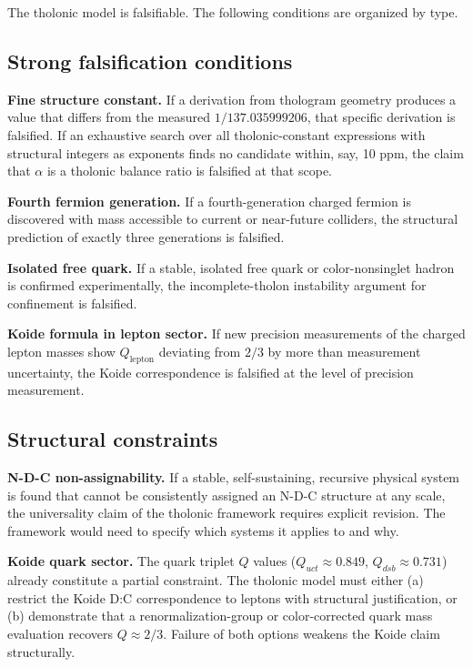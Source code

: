 \documentclass[12pt]{article}
\begin{document}
The tholonic model is falsifiable. The following conditions are
organized by type.

\subsection{Strong falsification conditions}\label{strong-falsification-conditions}

\textbf{Fine structure constant.} If a derivation from thologram
geometry produces a value that differs from the measured
\(1/137.035999206\), that specific derivation is falsified. If an
exhaustive search over all tholonic-constant expressions with structural
integers as exponents finds no candidate within, say, 10 ppm, the claim
that \(\alpha\) is a tholonic balance ratio is falsified at that scope.

\textbf{Fourth fermion generation.} If a fourth-generation charged
fermion is discovered with mass accessible to current or near-future
colliders, the structural prediction of exactly three generations is
falsified.

\textbf{Isolated free quark.} If a stable, isolated free quark or
color-nonsinglet hadron is confirmed experimentally, the
incomplete-tholon instability argument for confinement is falsified.

\textbf{Koide formula in lepton sector.} If new precision measurements
of the charged lepton masses show \(Q_{\text{lepton}}\) deviating from
\(2/3\) by more than measurement uncertainty, the Koide correspondence
is falsified at the level of precision measurement.

\subsection{Structural constraints}\label{structural-constraints}

\textbf{N-D-C non-assignability.} If a stable, self-sustaining,
recursive physical system is found that cannot be consistently assigned
an N-D-C structure at any scale, the universality claim of the tholonic
framework requires explicit revision. The framework would need to
specify which systems it applies to and why.

\textbf{Koide quark sector.} The quark triplet \(Q\) values
(\(Q_{uct} \approx 0.849\), \(Q_{dsb} \approx 0.731\)) already
constitute a partial constraint. The tholonic model must either (a)
restrict the Koide D:C correspondence to leptons with structural
justification, or (b) demonstrate that a renormalization-group or
color-corrected quark mass evaluation recovers \(Q \approx 2/3\).
Failure of both options weakens the Koide claim structurally.
\end{document}
